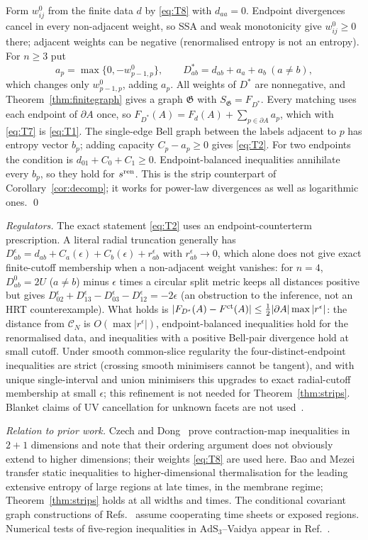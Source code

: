 \documentclass[aps,prd,onecolumn,superscriptaddress,nofootinbib,amsmath,amssymb,11pt]{revtex4-2}
\theoremstyle{definition}
\newcommand{\AdS}{\mathrm{AdS}_3}
\newcommand{\CN}{\mathcal{C}_N}
\newcommand{\eps}{\epsilon}
\begin{document}
Form $w^0_{ij}$ from the finite data $d$ by \eqref{eq:T8} with $d_{aa}=0$. Endpoint divergences cancel in every non-adjacent weight, so
SSA and weak monotonicity give $w^0_{ij}\ge0$ there; adjacent weights can be negative (renormalised entropy is not an entropy). For $n\ge3$
put
\begin{equation}\label{eq:T10}
a_p=\max\{0,-w^0_{p-1,p}\},\qquad D^*_{ab}=d_{ab}+a_a+a_b\ (a\ne b),
\end{equation}
which changes only $w^0_{p-1,p}$, adding $a_p$. All weights of $D^*$ are nonnegative, and Theorem~\ref{thm:finitegraph} gives a graph
$\mathfrak G$ with $S_{\mathfrak G}=F_{D^*}$. Every matching uses each endpoint of $\partial A$ once, so $F_{D^*}(A)=F_d(A)+\sum_{p\in\partial A}a_p$,
which with \eqref{eq:T7} is \eqref{eq:T1}. The single-edge Bell graph between the labels adjacent to $p$ has entropy vector $b_p$; adding
capacity $C_p-a_p\ge0$ gives \eqref{eq:T2}. For two endpoints the condition is $d_{01}+C_0+C_1\ge0$. Endpoint-balanced inequalities
annihilate every $b_p$, so they hold for $s^{\rm ren}$. This is the strip counterpart of Corollary~\ref{cor:decomp}; it works for power-law
divergences as well as logarithmic ones. \qed

\emph{Regulators.} The exact statement \eqref{eq:T2} uses an endpoint-counterterm prescription. A literal radial truncation generally has
$D^\eps_{ab}=d_{ab}+C_a(\eps)+C_b(\eps)+r^\eps_{ab}$ with $r^\eps_{ab}\to0$, which alone does not give exact finite-cutoff membership when a
non-adjacent weight vanishes: for $n=4$, $D^0_{ab}=2U$ ($a\ne b$) minus $\eps$ times a circular split metric keeps all distances positive but
gives $D^\eps_{02}+D^\eps_{13}-D^\eps_{03}-D^\eps_{12}=-2\eps$ (an obstruction to the inference, not an HRT counterexample). What holds is
$|F_{D^\eps}(A)-F^{\rm ct}(A)|\le\frac12|\partial A|\max|r^\eps|$: the distance from $\CN$ is $O(\max|r^\eps|)$, endpoint-balanced inequalities hold
for the renormalised data, and inequalities with a positive Bell-pair divergence hold at small cutoff. Under smooth common-slice
regularity the four-distinct-endpoint inequalities are strict (crossing smooth minimisers cannot be tangent), and with unique
single-interval and union minimisers this upgrades to exact radial-cutoff membership at small $\eps$; this refinement is not needed for
Theorem~\ref{thm:strips}. Blanket claims of UV cancellation for unknown facets are not used~\cite{JuCzech2026}.

\emph{Relation to prior work.} Czech and Dong~\cite{CzechDong2019} prove contraction-map inequalities in $2+1$ dimensions and note that
their ordering argument does not obviously extend to higher dimensions; their weights \eqref{eq:T8} are used here. Bao and
Mezei~\cite{BaoMezei2018} transfer static inequalities to higher-dimensional thermalisation for the leading extensive entropy of large
regions at late times, in the membrane regime; Theorem~\ref{thm:strips} holds at all widths and times. The conditional covariant graph
constructions of Refs.~\cite{GGHHMinimax2025,Zhao2026} assume cooperating time sheets or exposed regions. Numerical tests of five-region
inequalities in $\AdS$--Vaidya appear in Ref.~\cite{Caginalp2020}.
\end{document}
